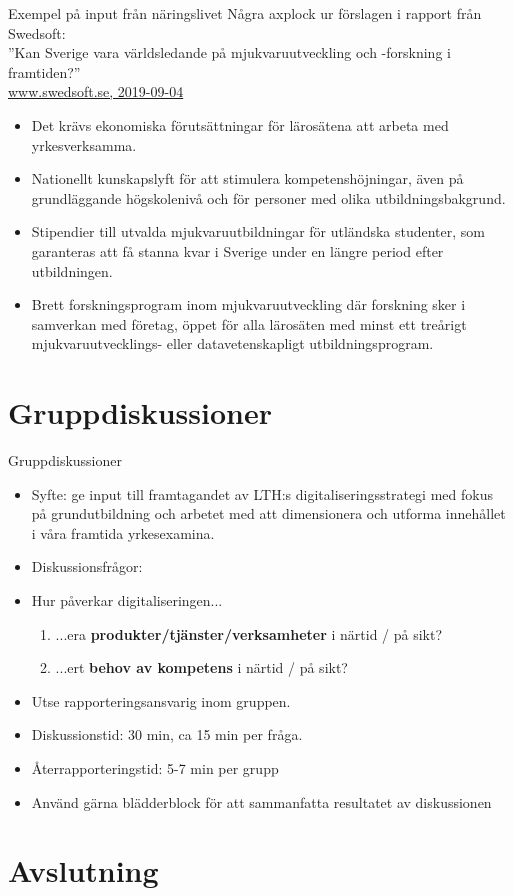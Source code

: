 \documentclass[aspectratio=169]{beamer}
\newenvironment{Slide}[1]%
  {\begin{frame}[environment=Slide]{#1}}
  {\end{frame}}%
\begin{document}
\begin{Slide}{Exempel på input från näringslivet}
  Några axplock ur förslagen i rapport från Swedsoft: \\''Kan Sverige vara världsledande på mjukvaruutveckling och -forskning i framtiden?''\\
  \href{https://www.swedsoft.se/wp-content/uploads/sites/7/2019/09/Swedsoft-Helhetssyn-p\%C3\%A5-mjukvarans-betydelse-f\%C3\%B6r-digitalisering-och-konkurrenskraft.pdf}{www.swedsoft.se, 2019-09-04}
\begin{itemize}
  \item Det krävs ekonomiska förutsättningar för lärosätena att arbeta med yrkesverksamma.
  \item Nationellt kunskapslyft för att stimulera kompetenshöjningar, även på grundläggande högskolenivå och för personer med olika utbildningsbakgrund.
  \item Stipendier till utvalda mjukvaruutbildningar för utländska studenter, som garanteras att få stanna kvar i Sverige under en längre period efter utbildningen.
  \item Brett forskningsprogram inom mjukvaruutveckling där forskning sker i samverkan med företag, öppet för alla lärosäten med minst ett treårigt mjukvaruutvecklings- eller datavetenskapligt utbildningsprogram.
  
\end{itemize}
\end{Slide}


\section{Gruppdiskussioner}

\begin{Slide}{Gruppdiskussioner}
  \begin{itemize}
    \item Syfte: ge input till framtagandet av LTH:s digitaliseringsstrategi med fokus på grundutbildning och arbetet med att dimensionera och utforma innehållet i våra framtida yrkesexamina.
    \item Diskussionsfrågor: \\ 
    \item[] Hur påverkar digitaliseringen...

    \begin{enumerate}
        \item  ...era \textbf{produkter/tjänster/verksamheter} i
        närtid / på sikt?
        
        \item ...ert \textbf{behov av kompetens} i närtid / på
        sikt?
    \end{enumerate}

    \item Utse rapporteringsansvarig inom gruppen.
    \item Diskussionstid: 30 min, ca 15 min per fråga.
    \item Återrapporteringstid: 5-7 min per grupp
    \item Använd gärna blädderblock för att sammanfatta resultatet av diskussionen 
  \end{itemize}
\end{Slide}

\section{Avslutning}
\end{document}
